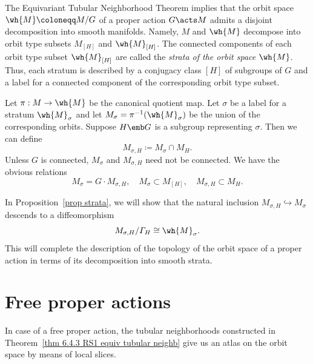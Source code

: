 \begin{rem}[Strata]\label{rem strata}
    The Equivariant Tubular Neighborhood Theorem implies that the orbit space $\wh{M}\coloneqq M\slash G$ of a proper action $G\acts M$ admits a disjoint decomposition into smooth manifolds. Namely, $M$ and $\wh{M}$ decompose into orbit type subsets $M_{[H]}$ and $\wh{M}_{[H]}$. The connected components of each orbit type subset $\wh{M}_{[H]}$ are called the \emph{strata of the orbit space $\wh{M}$}. Thus, each stratum is described by a conjugacy class $[H]$ of subgroups of $G$ and a label for a connected component of the corresponding orbit type subset. 
    
    Let $\pi:M\to \wh{M}$ be the canonical quotient map. Let $\sigma$ be a label for a stratum $\wh{M}_\sigma$ and let $M_\sigma=\pi^{-1}(\wh{M}_\sigma)$ be the union of the corresponding orbits. Suppose $H\emb G$ is a subgroup representing $\sigma$. Then we can define 
    \[M_{\sigma,H}\coloneqq M_\sigma\cap M_H.\]
    Unless $G$ is connected, $M_\sigma$ and $M_{\sigma,H}$ need not be connected. We have the obvious relations
    \[M_\sigma=G\cdot M_{\sigma,H},\quad M_\sigma\subset M_{[H]},\quad M_{\sigma,H}\subset M_H.\]

    In Proposition~\ref{prop strata}, we will show that the natural inclusion $M_{\sigma,H}\hookrightarrow M_\sigma$ descends to a diffeomorphism 
    \[M_{\sigma,H}\slash \varGamma_H\cong \wh{M}_\sigma.\] 
    This will complete the description of the topology of the orbit space of a proper action in terms of its decomposition into smooth strata.
\end{rem}









\section{Free proper actions}\label{sec: free proper actions}

In case of a free proper action, the tubular neighborhoods constructed in Theorem~\ref{thm 6.4.3 RS1 equiv tubular neighb} give us an atlas on the orbit space by means of local slices.


